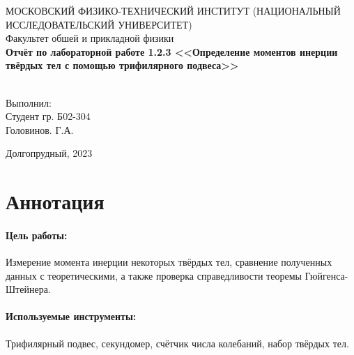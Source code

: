 \documentclass[a4paper,12pt]{article}
\begin{document}
	\begin{center}
		МОСКОВСКИЙ ФИЗИКО-ТЕХНИЧЕСКИЙ ИНСТИТУТ (НАЦИОНАЛЬНЫЙ ИССЛЕДОВАТЕЛЬСКИЙ УНИВЕРСИТЕТ) \\
		
		
		\hfill \break
		Факультет обшей и прикладной физики\\
		\vspace{2.5cm}
		\large{\textbf{Отчёт по лабораторной работе 1.2.3 <<Определение моментов инерции твёрдых тел с помощью трифилярного подвеса>>}}\\
		\hfill \break
		\\
	\end{center}
	
	\vspace{5cm}
	
	\begin{flushright}
		Выполнил:\\
		Студент гр. Б02-304\\
		Головинов. Г.А.
	\end{flushright}
	
	\vfill
	
	
	\begin{center} Долгопрудный, 2023 \end{center}
	
	\thispagestyle{empty}
	\newpage
	
	\section{Аннотация}
	\paragraph{Цель работы:} \hspace{-4mm} Измерение момента инерции некоторых твёрдых тел, сравнение полученных данных с теоретическими, а также проверка справедливости теоремы Гюйгенса-Штейнера.
	\paragraph{Используемые инструменты:} \hspace{-4mm} Трифилярный подвес, секундомер, счётчик числа колебаний, набор твёрдых тел.\\
\end{document}
